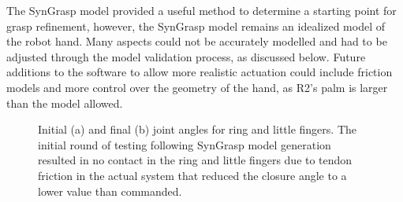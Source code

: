 \documentclass[runningheads,a4paper]{llncs}
\begin{document}
The SynGrasp model provided a useful method to determine a starting point for grasp refinement, however, the SynGrasp model remains an idealized model of the robot hand. Many aspects could not be accurately modelled and had to be adjusted through the model validation process, as discussed below. Future additions to the software to allow more realistic actuation could include friction models and more control over the geometry of the hand, as R2's palm is larger than the model allowed. 

\begin{figure}[!b]
\centering
\null\hfill
	\quad
	\hfill
	\hfill\null
  \caption{Initial (a) and final (b) joint angles for ring and little fingers. The initial round of testing following SynGrasp model generation resulted in no contact in the ring and little fingers due to tendon friction in the actual system that reduced the closure angle to a lower value than commanded.}%
\label{pinkymodels}%
\end{figure}
\end{document}
